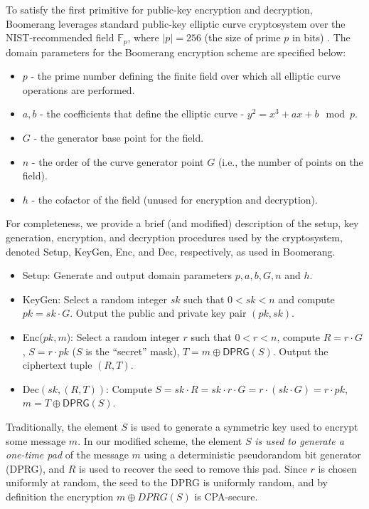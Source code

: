 To satisfy the first primitive for public-key encryption and decryption, Boomerang leverages standard public-key elliptic curve cryptosystem over the NIST-recommended field $\mathbb{F}_{p}$, where $|p| = 256$ (the size of prime $p$ in bits) \cite{nist-curves}. The domain parameters for the Boomerang encryption scheme are specified below:
\begin{itemize}
	\item $p$ - the prime number defining the finite field over which all elliptic curve operations are performed.
	\item $a, b$ - the coefficients that define the elliptic curve - $y^2 = x^3 +ax + b \mod p$.
	\item $G$ - the generator base point for the field.
	\item $n$ - the order of the curve generator point $G$ (i.e., the number of points on the field).
	\item $h$ - the cofactor of the field (unused for encryption and decryption).
\end{itemize}
For completeness, we provide a brief (and modified) description of the setup, key generation, encryption, and decryption procedures used by the cryptosystem, denoted {\sf Setup}, {\sf KeyGen}, {\sf Enc}, and {\sf Dec}, respectively, as used in Boomerang. 
\begin{itemize}
	\item {\sf Setup}: Generate and output domain parameters $p,a,b,G,n$ and $h$. 
	\item {\sf KeyGen}: Select a random integer $sk$ such that $0 < sk < n$ and compute $pk = sk \cdot G$. Output the public and private key pair $(pk, sk)$.
	\item {\sf Enc}($pk, m$): Select a random integer $r$ such that $0 < r < n$, compute $R = r \cdot G$, $S = r \cdot pk$ ($S$ is the ``secret'' mask), $T = m \oplus \mathsf{DPRG}(S)$. Output the ciphertext tuple $(R, T)$.
	\item {\sf Dec}$(sk, (R, T))$: Compute $S = sk \cdot R = sk \cdot r \cdot G = r \cdot (sk \cdot G) = r \cdot pk$, $m = T \oplus \mathsf{DPRG}(S)$.
\end{itemize}
Traditionally, the element $S$ is used to generate a symmetric key used to encrypt some message $m$. In our modified scheme, the element $S$ \emph{is used to generate a one-time pad} of the message $m$ using a deterministic pseudorandom bit generator (DPRG), and $R$ is used to recover the seed to remove this pad. Since $r$ is chosen uniformly at random, the seed to the DPRG is uniformly random, and by definition the encryption $m \oplus DPRG(S)$ is CPA-secure. 

